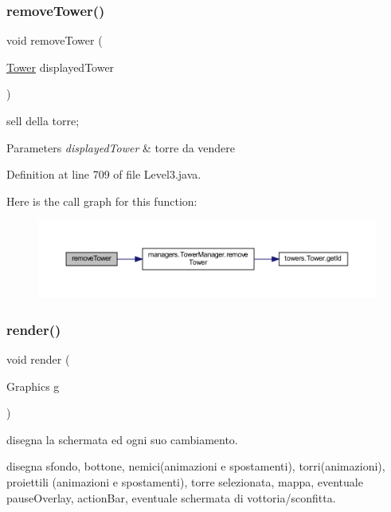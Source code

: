 \subsubsection{\texorpdfstring{remove\+Tower()}{removeTower()}}
{\footnotesize\ttfamily void remove\+Tower (\begin{DoxyParamCaption}\item[{\hyperlink{classtowers_1_1_tower}{Tower}}]{displayed\+Tower }\end{DoxyParamCaption})}



sell della torre; 


\begin{DoxyParams}{Parameters}
{\em displayed\+Tower} & torre da vendere \\
\hline
\end{DoxyParams}


Definition at line 709 of file Level3.\+java.

Here is the call graph for this function\+:
\nopagebreak
\begin{figure}[H]
\begin{center}
\leavevmode
\includegraphics[width=350pt]{classscenes_1_1_level3_addba85b44e35a186e066b2e801f433c4_cgraph}
\end{center}
\end{figure}
\mbox{\label{classscenes_1_1_level3_a203b6ad9d5e4d54dd1152986eec4dedc}} 
\subsubsection{\texorpdfstring{render()}{render()}}
{\footnotesize\ttfamily void render (\begin{DoxyParamCaption}\item[{Graphics}]{g }\end{DoxyParamCaption})}



disegna la schermata ed ogni suo cambiamento. 

disegna sfondo, bottone, nemici(animazioni e spostamenti), torri(animazioni), proiettili (animazioni e spostamenti), torre selezionata, mappa, eventuale pause\+Overlay, action\+Bar, eventuale schermata di vottoria/sconfitta.


